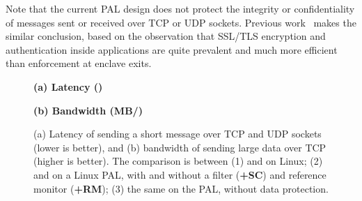 

Note that the current \sgx{} PAL design
does not protect the integrity or confidentiality of messages sent or received
over TCP or UDP sockets.
Previous work~\cite{osdi16scone} makes the similar conclusion,
based on the observation that
SSL/TLS encryption and authentication inside applications
are quite prevalent
and much more efficient
than enforcement at enclave exits.


\begin{figure*}[t!]
\centering
\footnotesize
{}
\parbox{0.24\textwidth}{\quad}
\parbox{0.49\textwidth}{\centering\bf (a) Latency ({\usec})}
\parbox{0.24\textwidth}{\centering\bf (b) Bandwidth (MB/\asec{})}
\caption{(a) Latency of sending a short message over TCP and UDP sockets (lower is better), and (b) bandwidth of sending large data over TCP (higher is better).
The comparison is between (1)  and  on Linux; (2)  and  on a Linux PAL, with and without a \seccomp{} filter ({\bf +SC}) and reference monitor ({\bf +RM}); (3) the same \hostapis{} on the \sgx{} PAL, without data protection.}
\label{fig:eval:pal:network-latency-bandwidth}
\end{figure*}


